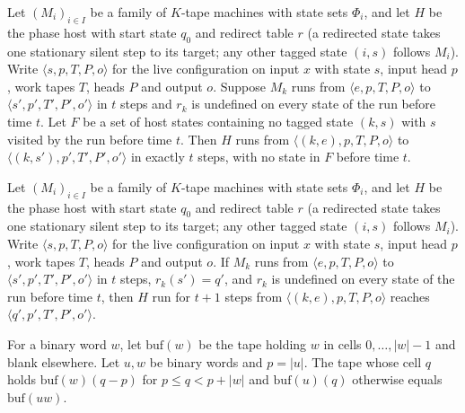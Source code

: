 \begin{theorem}
\label{Turing.NTimeDiag.qy_hosted_last}
\leanok
{}
Let $(M_i)_{i \in I}$ be a family of $K$-tape machines with state sets $\Phi_i$, and let $H$ be
the phase host with start state $q_0$ and redirect table $r$ (a redirected state takes one
stationary silent step to its target; any other tagged state $(i, s)$ follows $M_i$). Write
$\langle s, p, T, P, o\rangle$ for the live configuration on input $x$ with state $s$, input head
$p$, work tapes $T$, heads $P$ and output $o$. Suppose $M_k$ runs from
$\langle e, p, T, P, o\rangle$ to $\langle s', p', T', P', o'\rangle$ in $t$ steps and $r_k$ is
undefined on every state of the run before time $t$. Let $F$ be a set of host states containing
no tagged state $(k, s)$ with $s$ visited by the run before time $t$. Then $H$ runs from
$\langle (k, e), p, T, P, o\rangle$ to $\langle (k, s'), p', T', P', o'\rangle$ in exactly $t$
steps, with no state in $F$ before time $t$.
\end{theorem}

\begin{theorem}
\label{Turing.NTimeDiag.qy_hosted_run}
\leanok
{}
Let $(M_i)_{i \in I}$ be a family of $K$-tape machines with state sets $\Phi_i$, and let $H$ be
the phase host with start state $q_0$ and redirect table $r$ (a redirected state takes one
stationary silent step to its target; any other tagged state $(i, s)$ follows $M_i$). Write
$\langle s, p, T, P, o\rangle$ for the live configuration on input $x$ with state $s$, input head
$p$, work tapes $T$, heads $P$ and output $o$. If $M_k$ runs from
$\langle e, p, T, P, o\rangle$ to $\langle s', p', T', P', o'\rangle$ in $t$ steps,
$r_k(s') = q'$, and $r_k$ is undefined on every state of the run before time $t$, then $H$ run
for $t + 1$ steps from $\langle (k, e), p, T, P, o\rangle$ reaches
$\langle q', p', T', P', o'\rangle$.
\end{theorem}

\begin{theorem}
\label{Turing.NTimeDiag.qy_patch_end}
\leanok
{}
For a binary word $w$, let $\mathrm{buf}(w)$ be the tape holding $w$ in cells
$0, \dots, |w| - 1$ and blank elsewhere. Let $u, w$ be binary words and $p = |u|$. The tape whose
cell $q$ holds $\mathrm{buf}(w)(q - p)$ for $p \le q < p + |w|$ and $\mathrm{buf}(u)(q)$ otherwise
equals $\mathrm{buf}(uw)$.
\end{theorem}

